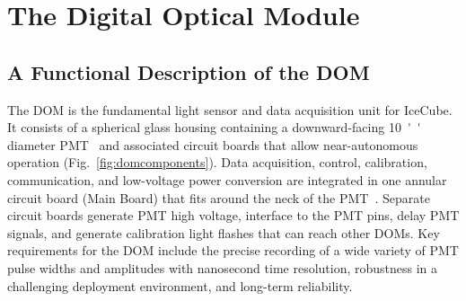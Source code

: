 
\newcommand{\degC}[1]{$\unit[#1]{^\circ{C}}$}
\def\lsim{\mathrel{\rlap{\raise 0.2ex\hbox{$\,<\,$}}{\lower 0.9ex\hbox{$\,\sim\,$}}}}
\def\gsim{\mathrel{\rlap{\raise 0.2ex\hbox{$\,>\,$}}{\lower 0.9ex\hbox{$\,\sim\,$}}}}


\section{\label{sec:dom}The Digital Optical Module}

\subsection{\label{sec:dom_functional}A Functional Description of the DOM}

The DOM is the fundamental light sensor and data acquisition unit for IceCube.
It consists of a spherical glass housing 
containing a downward-facing \SI{10}{''} diameter PMT~\cite{ICECUBE:PMT}
and associated circuit boards that allow near-autonomous operation (Fig.~\ref{fig:domcomponents}).
Data acquisition, control, calibration, communication, and low-voltage power conversion 
are integrated in one annular circuit board (Main Board) that fits around the neck of the PMT~\cite{ICECUBE:DAQ}. 
Separate circuit boards generate PMT high voltage, interface to the PMT pins,
delay PMT signals, and generate calibration light flashes that can reach other DOMs.
Key requirements for the DOM include
the precise recording of a wide variety of PMT pulse widths and amplitudes
with nanosecond time resolution, robustness in 
a challenging deployment environment, and long-term reliability.


